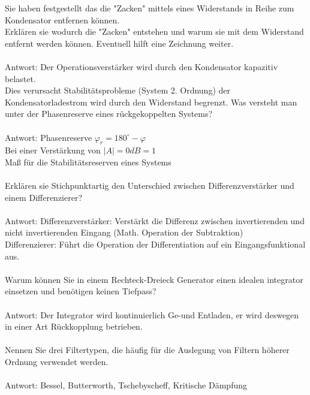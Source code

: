 \documentclass[A4]{scrartcl}
\begin{document}
  Sie haben festgestellt das die "Zacken" mittels eines Widerstands in Reihe zum Kondensator entfernen können.\\
  Erklären sie wodurch die "Zacken" entstehen und warum sie mit dem Widerstand entfernt werden können. Eventuell hilft eine Zeichnung weiter.\\
  \\
  Antwort: Der Operationsverstärker wird durch den Kondensator kapazitiv belastet.\\
  Dies verursacht Stabilitätsprobleme (System 2. Ordnung) der Kondensatorladestrom wird durch den Widerstand begrenzt. 
  Was versteht man unter der Phasenreserve eines rückgekoppelten Systems?\\
  \\
  Antwort: Phasenreserve $ \varphi_r = 180^\circ - \varphi$\\
  Bei einer Verstärkung von $|A|=0dB=1$\\
  Maß für die Stabilitätsreserven eines Systems\\\\
  Erklären sie Stichpunktartig den Unterschied zwischen Differenzverstärker und einem Differenzierer?\\
  \\
  Antwort:
  Differenzverstärker: Verstärkt die Differenz zwischen invertierenden und nicht invertierenden Eingang (Math. Operation der Subtraktion)\\
  Differenzierer: Führt die Operation der Differentiation auf ein Eingangsfunktional aus.\\\\
  Warum können Sie in einem Rechteck-Dreieck Generator einen idealen integrator einsetzen und benötigen keinen Tiefpass?\\
  \\
  Antwort: Der Integrator wird kontinuierlich Ge-und Entladen, er wird deswegen in einer Art Rückkopplung betrieben.\\\\
  Nennen Sie drei Filtertypen, die häufig für die Auslegung von Filtern höherer Ordnung verwendet werden.\\
  \\
  Antwort: Bessel, Butterworth, Tschebyscheff, Kritische Dämpfung\\\\
\end{document}
